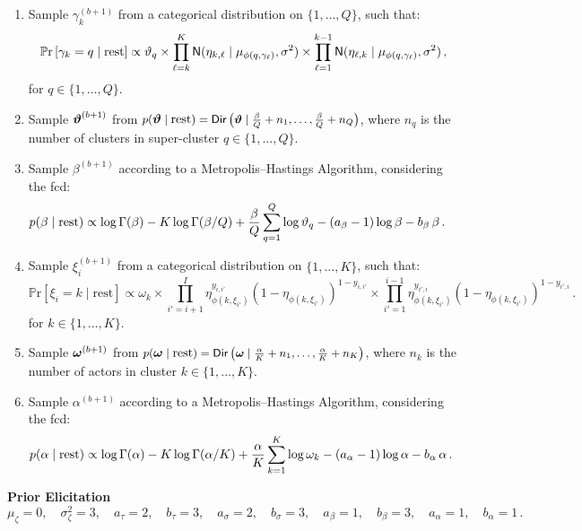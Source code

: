 \documentclass[letterpaper,12pt,openany]{article}
\def\frac#1#2{{{#1}\over{#2}}}
\newcommand{\pr}[1]{\mathbb{P}\text{r}\left[#1\right]}
\def\Dir{\small{\mathsf{Dir}}}
\def\Nor{\small{\mathsf{N}}}
\def\rest{\text{rest}}
\def\al{\alpha}\def\alv{\boldsymbol{\alpha}}
\def\be{\beta}\def\bev{\boldsymbol{\beta}}
\def\ga{\gamma}\def\gav{\boldsymbol{\gamma}}
\def\sig{\sigma}\def\sigv{\boldsymbol{\sigma}}
\begin{document}
\begin{enumerate}
	\item Sample $\ga_k^{(b+1)}$ from a categorical distribution on $\{1,\ldots,Q\}$, such that:
	$$
	\pr{\ga_k=q\mid\rest}\propto \vartheta_q
	\times\prod_{\ell=k}^K \Nor(\eta_{k,\ell} \mid \mu_{\phi(q,\ga_\ell)}, \sig^2) 
	\times\prod_{\ell=1}^{k-1} \Nor(\eta_{\ell,k} \mid \mu_{\phi(q,\ga_\ell)}, \sig^2)\,,
	$$
	for $q \in \{1,\ldots,Q \}$.
	
	\item Sample $\boldsymbol{\vartheta}^{(b+1)}$ from $p(\vtev\mid\rest) = \Dir\left(\vtev\mid\tfrac{\be}{Q}+n_1,\ldots,\tfrac{\be}{Q}+n_Q\right)$, where $n_q$ is the number of clusters in super-cluster $q \in \{1,\ldots, Q\}$.
	
	\item Sample $\beta^{(b+1)}$ according to a Metropolis--Hastings Algorithm, considering the fcd:
	\begin{align*}
	p(\beta\mid\rest)
	&\propto
	\log\Gamma(\beta) - K\log\Gamma(\beta/Q) + \frac{\beta}{Q}\sum_{q=1}^Q\log\vartheta_q - (a_\beta-1)\log\beta - b_\beta\,\beta\,.
	\end{align*}
	
	\item Sample $\xi_i^{(b+1)}$ from a categorical distribution on $\{1,\ldots,K\}$, such that:
	$$
	\pr{\xi_i=k\mid\rest}\propto \omega_k
	\times\prod_{i'=i+1}^I \eta_{\phi(k,\xi_{i'})}^{y_{i,i'}}(1-\eta_{\phi(k,\xi_{i'})})^{1-y_{i,i'}}
	\times\prod_{i'=1}^{i-1} \eta_{\phi(k,\xi_{i'})}^{y_{i',i}}(1-\eta_{\phi(k,\xi_{i'})})^{1-y_{i',i}}\,.
	$$
	for $k \in\{ 1,\ldots,K \}$.
	
	\item Sample $\boldsymbol{\omega}^{(b+1)}$ from $p(\omev\mid\rest) = \Dir\left(\omev\mid\tfrac{\al}{K}+n_1,\ldots,\tfrac{\al}{K}+n_K\right)$, where $n_k$ is the number of actors in cluster $k\in\{1,\ldots,K\}$.
	
	\item Sample $\alpha^{(b+1)}$ according to a Metropolis--Hastings Algorithm, considering the fcd:
	\begin{align*}
	p(\alpha\mid\rest)
	&\propto
	\log\Gamma(\alpha) - K\log\Gamma(\alpha/K) + \frac{\al}{K}\sum_{k=1}^K\log\omega_k - (a_\alpha-1)\log\al - b_\al\,\al\,.
	\end{align*}
	
\end{enumerate}


\textbf{Prior Elicitation}
$$
\mu_\zeta    = 0,\quad 
\sig^2_\zeta = 3,\quad
a_\tau       = 2,\quad 
b_\tau       = 3,\quad
a_{\sig}     = 2,\quad
b_{\sig}     = 3,\quad
a_{\be}      = 1,\quad 
b_{\be}      = 3,\quad 
a_\al        = 1,\quad 
b_\al        = 1\,.
$$
\end{document}
